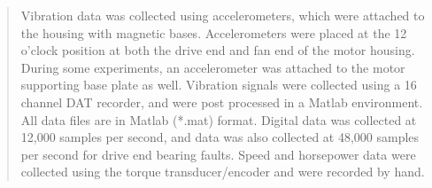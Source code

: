 \documentclass[
  letterpaper,
  DIV=11,
  numbers=noendperiod]{scrartcl}
\begin{document}
\begin{quote}
Vibration data was collected using accelerometers, which were attached
to the housing with magnetic bases. Accelerometers were placed at the 12
o'clock position at both the drive end and fan end of the motor housing.
During some experiments, an accelerometer was attached to the motor
supporting base plate as well. Vibration signals were collected using a
16 channel DAT recorder, and were post processed in a Matlab
environment. All data files are in Matlab (*.mat) format. Digital data
was collected at 12,000 samples per second, and data was also collected
at 48,000 samples per second for drive end bearing faults. Speed and
horsepower data were collected using the torque transducer/encoder and
were recorded by hand.
\end{quote}
\end{document}
